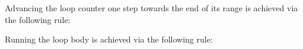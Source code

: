 \FormallyParagraph
Advancing the loop counter one step towards the end of its range is achieved via the following rule:
\begin{mathpar}
\end{mathpar}

Running the loop body is achieved via the following rule:
\begin{mathpar}
\end{mathpar}

